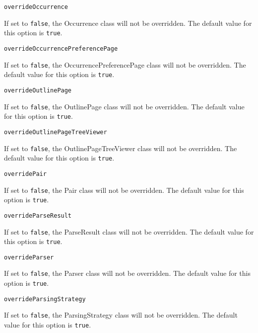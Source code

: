 \noindent\texttt{overrideOccurrence}
\begin{myindentpar}{1cm}
If set to \texttt{false}, the Occurrence class will not be overridden. The default value for this option is \texttt{true}.
\end{myindentpar}

\noindent\texttt{overrideOccurrencePreferencePage}
\begin{myindentpar}{1cm}
If set to \texttt{false}, the OccurrencePreferencePage class will not be overridden. The default value for this option is \texttt{true}.
\end{myindentpar}

\noindent\texttt{overrideOutlinePage}
\begin{myindentpar}{1cm}
If set to \texttt{false}, the OutlinePage class will not be overridden. The default value for this option is \texttt{true}.
\end{myindentpar}

\noindent\texttt{overrideOutlinePageTreeViewer}
\begin{myindentpar}{1cm}
If set to \texttt{false}, the OutlinePageTreeViewer class will not be overridden. The default value for this option is \texttt{true}.
\end{myindentpar}

\noindent\texttt{overridePair}
\begin{myindentpar}{1cm}
If set to \texttt{false}, the Pair class will not be overridden. The default value for this option is \texttt{true}.
\end{myindentpar}

\noindent\texttt{overrideParseResult}
\begin{myindentpar}{1cm}
If set to \texttt{false}, the ParseResult class will not be overridden. The default value for this option is \texttt{true}.
\end{myindentpar}

\noindent\texttt{overrideParser}
\begin{myindentpar}{1cm}
If set to \texttt{false}, the Parser class will not be overridden. The default value for this option is \texttt{true}.
\end{myindentpar}

\noindent\texttt{overrideParsingStrategy}
\begin{myindentpar}{1cm}
If set to \texttt{false}, the ParsingStrategy class will not be overridden. The default value for this option is \texttt{true}.
\end{myindentpar}

